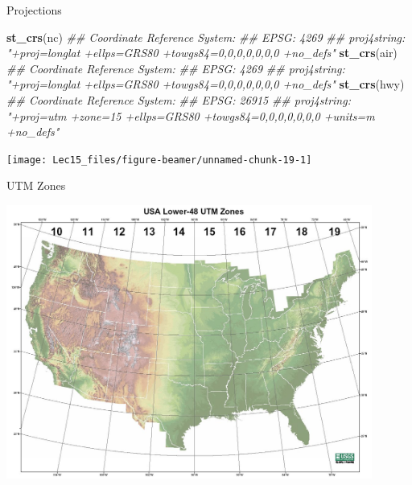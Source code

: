 \documentclass[11pt,ignorenonframetext,]{beamer}
\newenvironment{Shaded}{}{}
\newcommand{\CommentTok}[1]{\textcolor[rgb]{0.38,0.63,0.69}{\textit{#1}}}
\newcommand{\KeywordTok}[1]{\textcolor[rgb]{0.00,0.44,0.13}{\textbf{#1}}}
\newcommand{\NormalTok}[1]{#1}
\let\oldShaded\Shaded
\let\endoldShaded\endShaded
\renewenvironment{Shaded}{\footnotesize\begin{spacing}{0.9}\oldShaded}{\endoldShaded\end{spacing}}
\begin{document}
\begin{frame}[fragile,t]{Projections}
\protect\hypertarget{projections-1}{}

\begin{Shaded}
\begin{Highlighting}[]
\KeywordTok{st_crs}\NormalTok{(nc)}
\CommentTok{## Coordinate Reference System:}
\CommentTok{##   EPSG: 4269 }
\CommentTok{##   proj4string: "+proj=longlat +ellps=GRS80 +towgs84=0,0,0,0,0,0,0 +no_defs"}
\KeywordTok{st_crs}\NormalTok{(air)}
\CommentTok{## Coordinate Reference System:}
\CommentTok{##   EPSG: 4269 }
\CommentTok{##   proj4string: "+proj=longlat +ellps=GRS80 +towgs84=0,0,0,0,0,0,0 +no_defs"}
\KeywordTok{st_crs}\NormalTok{(hwy)}
\CommentTok{## Coordinate Reference System:}
\CommentTok{##   EPSG: 26915 }
\CommentTok{##   proj4string: "+proj=utm +zone=15 +ellps=GRS80 +towgs84=0,0,0,0,0,0,0 +units=m +no_defs"}
\end{Highlighting}
\end{Shaded}

\begin{center}\texttt{[image: Lec15\_files/figure-beamer/unnamed-chunk-19-1]} \end{center}

\end{frame}

\begin{frame}{UTM Zones}
\protect\hypertarget{utm-zones}{}

\begin{center}
\includegraphics[width=0.9\textwidth]{figs/UTM_Zones.png}
\end{center}

\end{frame}
\end{document}
